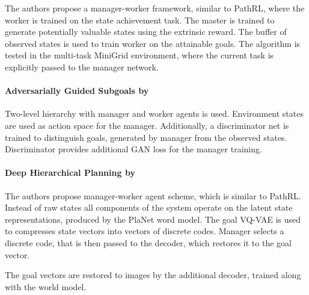 \documentclass[acmsmall, nonacm]{acmart}
\begin{document}
The authors propose a manager-worker framework, similar to PathRL, where the worker is trained on the state achievement task. The master is trained to generate potentially valuable states using the extrinsic reward. The buffer of observed states is used to train worker on the attainable goals. The algorithm is tested in the multi-task MiniGrid environment, where the current task is explicitly passed to the manager network.


\paragraph{Adversarially Guided Subgoals by \citet{https://doi.org/10.48550/arxiv.2201.09635}}

Two-level hierarchy with manager and worker agents is used. Environment states are used as action space for the manager. Additionally, a discriminator net is trained to distinguish goals, generated by manager from the observed states. Discriminator provides additional GAN loss for the manager training.


\paragraph{Deep Hierarchical Planning by \citet{https://doi.org/10.48550/arxiv.2206.04114}}

The authors propose manager-worker agent scheme, which is similar to PathRL. Instead of raw states all components of the system operate on the latent state representations, produced by the PlaNet word model. The goal VQ-VAE is used to compresses state vectors into vectors of discrete codes. Manager selects a discrete code, that is then passed to the decoder, which restores it to the goal vector.

The goal vectors are restored to images by the additional decoder, trained along with the world model.


\medskip



\end{document}

